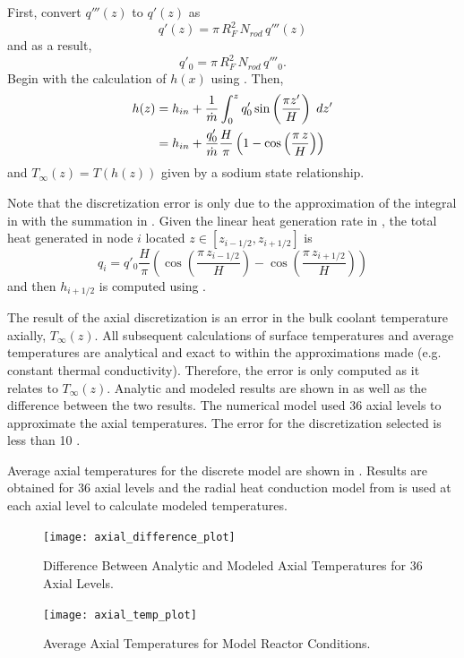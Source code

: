     First, convert $q'''(z)$ to $q'(z)$ as
    \begin{equation}
      \label{eq:qprime}
      q'(z) = \pi \, R_F^2 \, N_{rod} \, q'''(z)
    \end{equation}
    and as a result,
    \begin{equation}
      q'_0 = \pi \, R_F^2 \, N_{rod} \, q'''_0.
    \end{equation}
    Begin with the calculation of $h(x)$ using 
    . Then,
    \begin{align}
      h(z) &= h_{in} + \frac{1}{\dot{m}} 
        \int_0^z q'_0 \sin\left(\frac{\pi z'}{H}\right)\;dz' \\
      &= h_{in} + \frac{q'_0}{\dot{m}} \frac{H}{\pi}
        \left(1 - \cos\left(\frac{\pi \, z}{H}\right)\right)
    \end{align}
    and $T_{\infty}(z) = T(h(z))$ given by a sodium state relationship.

    Note that the discretization error is only due to the approximation of the
    integral in  with the summation in 
    . Given the linear heat generation rate in
    , the total heat generated in node $i$ located 
    ${z \in [z_{i-1/2},z_{i+1/2}]}$ is 
    \begin{equation}
      q_i = q'_0 \frac{H}{\pi} \left( \cos\left(\frac{\pi \,
      z_{i-1/2}}{H}\right) - \cos\left(\frac{\pi \, z_{i+1/2}}{H}\right)
      \right)
    \end{equation}
    and then $h_{i+1/2}$ is computed using .
    
    The result of the axial discretization is an error in the bulk coolant
    temperature axially, $T_{\infty}(z)$. All subsequent calculations of surface
    temperatures and average temperatures are analytical and exact to within the
    approximations made (e.g. constant thermal conductivity). Therefore, the
    error is only computed as it relates to $T_{\infty}(z)$. Analytic and
    modeled results are shown in  as well as the
    difference between the two results. The numerical model used 36 axial levels
    to approximate the axial temperatures. The error for the discretization
    selected is less than 10 . 
    
    Average axial temperatures for the discrete model 
    are shown in . Results are obtained for 36 axial
    levels and the radial heat conduction model from  is
    used at each axial level to calculate modeled temperatures.

    \begin{figure}
      \centering
      \texttt{[image: axial\_difference\_plot]}
      \caption{Difference Between Analytic and Modeled Axial Temperatures for 36
        Axial Levels.}
      \label{fig:axial_difference_plot}
    \end{figure}

    \begin{figure}
      \centering
      \texttt{[image: axial\_temp\_plot]}
      \caption{Average Axial Temperatures for Model Reactor Conditions.}
      \label{fig:axial_temp_plot}
    \end{figure}
